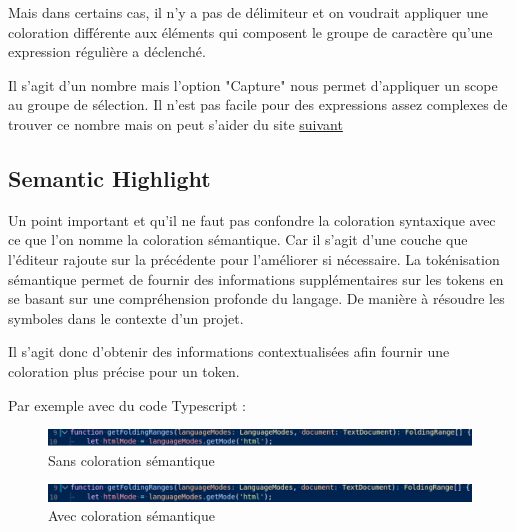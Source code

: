 \documentclass[
    iict, %
    il, %
]{heig-tb}
\begin{document}
Mais dans certains cas, il n'y a pas de délimiteur et on voudrait appliquer une coloration différente aux éléments qui composent le groupe de caractère qu'une expression régulière
a déclenché.

Il s'agit d'un nombre mais l'option "Capture" nous permet d'appliquer un scope au groupe de sélection.
Il n'est pas facile pour des expressions assez complexes de trouver ce nombre mais on peut s'aider du site \href{https://regex101.com/}{suivant}

\subsection{Semantic Highlight}

Un point important et qu'il ne faut pas confondre la coloration syntaxique avec ce que l'on nomme la coloration sémantique. Car il s'agit d'une couche que l'éditeur rajoute sur la précédente pour l'améliorer si nécessaire.
La tokénisation sémantique permet de fournir des informations supplémentaires sur les tokens en se basant sur une compréhension profonde du langage.
De manière à résoudre les symboles dans le contexte d'un projet.

Il s'agit donc d'obtenir des informations contextualisées afin fournir une coloration plus précise pour un token.

Par exemple avec du code Typescript :

\begin{figure}[!h]
    \begin{center}
        \includegraphics[width=15cm]{assets/figures/semantic-coloration-without.png}
    \end{center}
    \caption[Exemple sans coloration sémantique]{\label{semantic-coloration-without} Sans coloration sémantique}
\end{figure}

\begin{figure}[!h]
    \begin{center}
        \includegraphics[width=15cm]{assets/figures/semantic-coloration-with.png}
    \end{center}
    \caption[Exemple avec coloration sémantique ]{\label{semantic-coloration-with} Avec coloration sémantique }
\end{figure}
\end{document}
